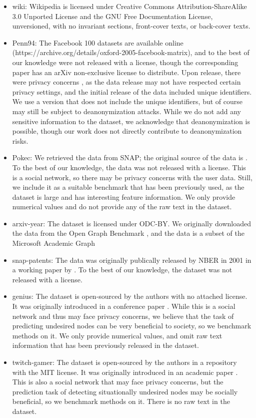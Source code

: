 \documentclass{article}
\begin{document}
\begin{itemize}
    \item wiki: Wikipedia is licensed under Creative Commons Attribution-ShareAlike 3.0 Unported License and the GNU Free Documentation License, unversioned, with no invariant sections, front-cover texts, or back-cover texts.
    \item Penn94: The Facebook 100 datasets are available online (https://archive.org/details/oxford-2005-facebook-matrix), and to the best of our knowledge were not released with a license, though the corresponding paper has an arXiv non-exclusive license to distribute. Upon release, there were privacy concerns \cite{zimmer11Facebook}, as the data release may not have respected certain privacy settings, and the initial release of the data included unique identifiers. We use a version that does not include the unique identifiers, but of course may still be subject to deanonymization attacks. While we do not add any sensitive information to the dataset, we acknowledge that deanonymization is possible, though our work does not directly contribute to deanonymization risks.
    \item Pokec: We retrieved the data from SNAP; the original source of the data is \cite{pokec}. To the best of our knowledge, the data was not released with a license. This is a social network, so there may be privacy concerns with the user data. Still, we include it as a suitable benchmark that has been previously used, as the dataset is large and has interesting feature information. We only provide numerical values and do not provide any of the raw text in the dataset.
    \item arxiv-year: The dataset is licensed under ODC-BY. We originally downloaded the data from the Open Graph Benchmark \cite{hu2020open}, and the data is a subset of the Microsoft Academic Graph \cite{Wang2020Microsoft}
    \item snap-patents: The data was originally publically released by NBER in 2001 in a working paper by \cite{NBERw8498}. To the best of our knowledge, the dataset was not released with a license. 
    \item genius: The dataset is open-sourced by the authors with no attached license. It was originally introduced in a conference paper \cite{lim2021expertise}. While this is a social network and thus may face privacy concerns, we believe that the task of predicting undesired nodes can be very beneficial to society, so we benchmark methods on it. We only provide numerical values, and omit raw text information that has been previously released in the dataset.
    \item twitch-gamer: The dataset is open-sourced by the authors in a repository with the MIT license. It was originally introduced in an academic paper \cite{mcpherson2001birds}. This is also a social network that may face privacy concerns, but the prediction task of detecting situationally undesired nodes may be socially beneficial, so we benchmark methods on it. There is no raw text in the dataset.
\end{itemize}
\end{document}
